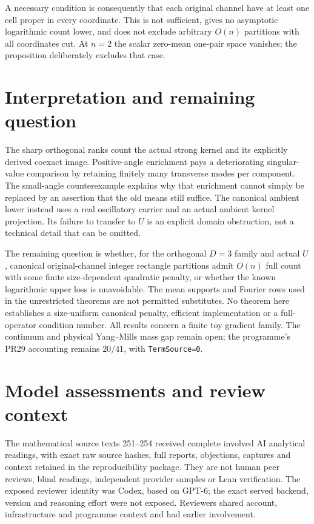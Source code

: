 \documentclass[11pt,a4paper]{article}
\begin{document}
A necessary condition is consequently that each original channel have at
least one cell proper in every coordinate. This is not sufficient, gives
no asymptotic logarithmic count lower, and does not exclude arbitrary
$O(n)$ partitions with all coordinates cut. At $n=2$ the scalar zero-mean
one-pair space vanishes; the proposition deliberately excludes that case.

\section{Interpretation and remaining question}
The sharp orthogonal ranks count the actual strong kernel and its explicitly
derived coexact image. Positive-angle enrichment pays a deteriorating
singular-value comparison by retaining finitely many transverse modes per
component. The small-angle counterexample explains why that enrichment cannot
simply be replaced by an assertion that the old means still suffice.
The canonical ambient lower instead uses a real oscillatory carrier and an
actual ambient kernel projection. Its failure to transfer to $U$ is an
explicit domain obstruction, not a technical detail that can be omitted.

The remaining question is whether, for the orthogonal $D=3$ family and actual
$U$, canonical original-channel integer rectangle partitions admit $O(n)$ full
count with some finite size-dependent quadratic penalty, or whether the
known logarithmic upper loss is unavoidable. The mean supports and Fourier
rows used in the unrestricted theorems are not permitted substitutes.
No theorem here establishes a size-uniform canonical penalty, efficient
implementation or a full-operator condition number. All results concern a
finite toy gradient family. The continuum and physical Yang--Mills mass gap
remain open; the programme's PR29 accounting remains $20/41$, with
\texttt{TermSource=0}.

\section{Model assessments and review context}
The mathematical source texts 251--254 received complete involved AI analytical
readings, with exact raw source hashes, full reports, objections, captures and
context retained in the reproducibility package. They are not human peer
reviews, blind readings, independent provider samples or Lean verification.
The exposed reviewer identity was Codex, based on GPT-6; the exact served
backend, version and reasoning effort were not exposed. Reviewers shared
account, infrastructure and programme context and had earlier involvement.
\end{document}
